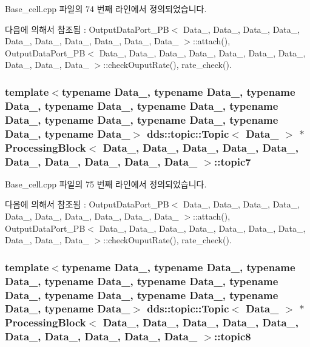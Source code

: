 Base\+\_\+cell.\+cpp 파일의 74 번째 라인에서 정의되었습니다.



다음에 의해서 참조됨 \+:  Output\+Data\+Port\+\_\+\+P\+B$<$ Data\+\_, Data\+\_, Data\+\_, Data\+\_, Data\+\_, Data\+\_, Data\+\_, Data\+\_, Data\+\_, Data\+\_ $>$\+::attach(), Output\+Data\+Port\+\_\+\+P\+B$<$ Data\+\_, Data\+\_, Data\+\_, Data\+\_, Data\+\_, Data\+\_, Data\+\_, Data\+\_, Data\+\_, Data\+\_ $>$\+::check\+Ouput\+Rate(), rate\+\_\+check().

\subsubsection[{\texorpdfstring{topic7}{topic7}}]{\setlength{\rightskip}{0pt plus 5cm}template$<$typename Data\+\_, typename Data\+\_, typename Data\+\_, typename Data\+\_, typename Data\+\_, typename Data\+\_, typename Data\+\_, typename Data\+\_, typename Data\+\_, typename Data\+\_$>$ dds\+::topic\+::\+Topic$<$ Data\+\_ $>$ $\ast$ {\bf Processing\+Block}$<$ Data\+\_, Data\+\_, Data\+\_, Data\+\_, Data\+\_, Data\+\_, Data\+\_, Data\+\_, Data\+\_, Data\+\_ $>$\+::topic7}\hypertarget{classProcessingBlock_aab1d9e5c6c530db34a95af444f81ad4b}{}\label{classProcessingBlock_aab1d9e5c6c530db34a95af444f81ad4b}


Base\+\_\+cell.\+cpp 파일의 75 번째 라인에서 정의되었습니다.



다음에 의해서 참조됨 \+:  Output\+Data\+Port\+\_\+\+P\+B$<$ Data\+\_, Data\+\_, Data\+\_, Data\+\_, Data\+\_, Data\+\_, Data\+\_, Data\+\_, Data\+\_, Data\+\_ $>$\+::attach(), Output\+Data\+Port\+\_\+\+P\+B$<$ Data\+\_, Data\+\_, Data\+\_, Data\+\_, Data\+\_, Data\+\_, Data\+\_, Data\+\_, Data\+\_, Data\+\_ $>$\+::check\+Ouput\+Rate(), rate\+\_\+check().

\subsubsection[{\texorpdfstring{topic8}{topic8}}]{\setlength{\rightskip}{0pt plus 5cm}template$<$typename Data\+\_, typename Data\+\_, typename Data\+\_, typename Data\+\_, typename Data\+\_, typename Data\+\_, typename Data\+\_, typename Data\+\_, typename Data\+\_, typename Data\+\_$>$ dds\+::topic\+::\+Topic$<$ Data\+\_ $>$ $\ast$ {\bf Processing\+Block}$<$ Data\+\_, Data\+\_, Data\+\_, Data\+\_, Data\+\_, Data\+\_, Data\+\_, Data\+\_, Data\+\_, Data\+\_ $>$\+::topic8}\hypertarget{classProcessingBlock_a3cf71cb6cd68dc3b5a0f5c3a4201f3cf}{}\label{classProcessingBlock_a3cf71cb6cd68dc3b5a0f5c3a4201f3cf}


